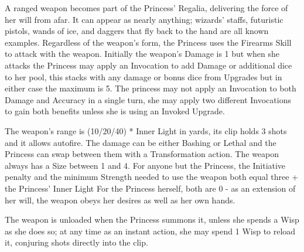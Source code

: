 \noindent A ranged weapon becomes part of the Princess’ Regalia, delivering the force of her will from afar. It can appear as nearly anything; wizards’ staffs, futuristic pistols, wands of ice, and daggers that fly back to the hand are all known examples. Regardless of the weapon's form, the Princess uses the Firearms Skill to attack with the weapon. Initially the weapon's Damage is 1 but when she attacks the Princess may apply an Invocation to add Damage or additional dice to her pool, this stacks with any damage or bonus dice from Upgrades but in either case the maximum is 5. The princess may not apply an Invocation to both Damage and Accuracy in a single turn, she may apply two different Invocations to gain both benefits unless she is using an Invoked Upgrade.  

The weapon’s range is (10/20/40) * Inner Light in yards, its clip holds 3 shots and it allows autofire. The damage can be either Bashing or Lethal and the Princess can swap between them with a Transformation action. The weapon always has a Size between 1 and 4. For anyone but the Princess, the Initiative penalty and the minimum Strength needed to use the weapon both equal three + the Princess' Inner Light For the Princess herself, both are 0 - as an extension of her will, the weapon obeys her desires as well as her own hands.

The weapon is unloaded when the Princess summons it, unless she spends a Wisp as she does so; at any time as an instant action, she may spend 1 Wisp to reload it, conjuring shots directly into the clip.

